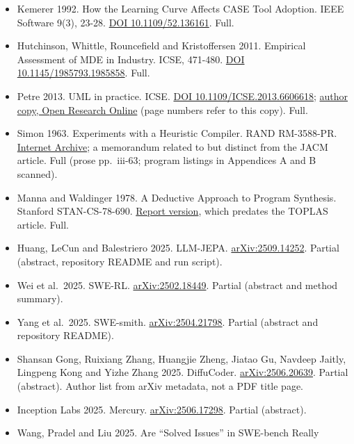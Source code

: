 \documentclass[10pt,letterpaper]{article}
\begin{document}
\begin{itemize}
  \href{https://doi.org/10.1016/0167-739X(93)90002-7}{DOI
  10.1016/0167-739X(93)90002-7}. Full.
\item
  Kemerer 1992. How the Learning Curve Affects CASE Tool Adoption. IEEE
  Software 9(3), 23-28. \href{https://doi.org/10.1109/52.136161}{DOI
  10.1109/52.136161}. Full.
\item
  Hutchinson, Whittle, Rouncefield and Kristoffersen 2011. Empirical
  Assessment of MDE in Industry. ICSE, 471-480.
  \href{https://doi.org/10.1145/1985793.1985858}{DOI
  10.1145/1985793.1985858}. Full.
\item
  Petre 2013. UML in practice. ICSE.
  \href{https://doi.org/10.1109/ICSE.2013.6606618}{DOI
  10.1109/ICSE.2013.6606618};
  \href{https://oro.open.ac.uk/35805/}{author copy, Open Research
  Online} (page numbers refer to this copy). Full.
\item
  Simon 1963. Experiments with a Heuristic Compiler. RAND RM-3588-PR.
  \href{https://archive.org/details/bitsavers_randiplRM3mpilerMay63_4935437}{Internet
  Archive}; a memorandum related to but distinct from the JACM article.
  Full (prose pp.~iii-63; program listings in Appendices A and B
  scanned).
\item
  Manna and Waldinger 1978. A Deductive Approach to Program Synthesis.
  Stanford STAN-CS-78-690.
  \href{http://i.stanford.edu/TR/CS-TR-78-690.html}{Report version},
  which predates the TOPLAS article. Full.
\item
  Huang, LeCun and Balestriero 2025. LLM-JEPA.
  \href{https://arxiv.org/abs/2509.14252}{arXiv:2509.14252}. Partial
  (abstract, repository README and run script).
\item
  Wei et al.~2025. SWE-RL.
  \href{https://arxiv.org/abs/2502.18449}{arXiv:2502.18449}. Partial
  (abstract and method summary).
\item
  Yang et al.~2025. SWE-smith.
  \href{https://arxiv.org/abs/2504.21798}{arXiv:2504.21798}. Partial
  (abstract and repository README).
\item
  Shansan Gong, Ruixiang Zhang, Huangjie Zheng, Jiatao Gu, Navdeep
  Jaitly, Lingpeng Kong and Yizhe Zhang 2025. DiffuCoder.
  \href{https://arxiv.org/abs/2506.20639}{arXiv:2506.20639}. Partial
  (abstract). Author list from arXiv metadata, not a PDF title page.
\item
  Inception Labs 2025. Mercury.
  \href{https://arxiv.org/abs/2506.17298}{arXiv:2506.17298}. Partial
  (abstract).
\item
  Wang, Pradel and Liu 2025. Are ``Solved Issues'' in SWE-bench Really

\end{itemize}
\end{document}
